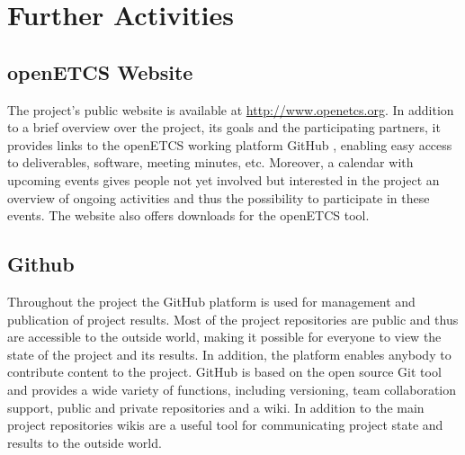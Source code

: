 ﻿\section{Further Activities}\label{sct:further_activities}

\subsection{openETCS Website}
The project's public website is available at \url{http://www.openetcs.org}. In addition to a brief overview over the project, its goals and the participating partners, it provides links to the openETCS working platform GitHub \cite{github}, enabling easy access to deliverables, software, meeting minutes, etc. Moreover, a calendar with upcoming events gives people not yet involved but interested in the project an overview of ongoing activities and thus the possibility to participate in these events. The website also offers downloads for the openETCS tool.



\subsection{Github}

Throughout the project the GitHub platform \cite{github} is used for management and publication of project results. Most of the project repositories are public and thus are accessible to the outside world, making it possible for everyone to view the state of the project and its results. In addition, the platform enables anybody to contribute content to the project. GitHub is based on the open source Git tool \cite{gittool} and provides a wide variety of functions, including versioning, team collaboration support, public and private repositories and a wiki. In addition to the main project repositories wikis are a useful tool for communicating project state and results to the outside world.




